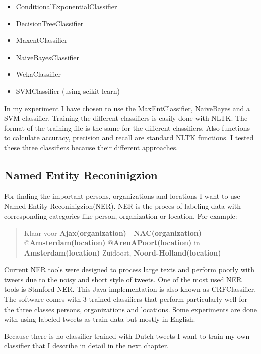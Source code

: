 \documentclass[
10pt, %
a4paper, %
oneside, %
headinclude,footinclude, %
BCOR5mm, %
]{scrartcl}
\begin{document}
\begin{itemize}[noitemsep]
\item ConditionalExponentialClassifier
\item DecisionTreeClassifier
\item MaxentClassifier
\item NaiveBayesClassifier
\item WekaClassifier
\item SVMClassifier (using scikit-learn)
\end{itemize}

In my experiment I have chosen to use the MaxEntClassifier, NaiveBayes and a SVM classifier. Training the different classifiers is easily done with NLTK. The format of the training file is the same for the different classifiers. Also functions to calculate accuracy, precision and recall are standard NLTK functions. I tested these three classifiers because their different approaches.

\newpage
\subsection{Named Entity Reconinigzion}
For finding the important persons, organizations and locations I want to use Named Entity Reconinigzion(NER). NER is the proces of labeling data with corresponding categories like person, organization or location. For example:

\begin {quote}
Klaar voor \textbf{Ajax(organization)} - \textbf{NAC(organization)} @\textbf{Amsterdam(location)} @\textbf{ArenAPoort(location) }in \textbf{Amsterdam(location)} Zuidoost, \textbf{Noord-Holland(location)}
\end{quote}

Current NER tools were designed to process large texts and perform poorly with tweets due to the noisy and short style of tweets. One of the most used NER tools is Stanford NER. This Java implementation is also known as CRFClassifier. The software comes with 3 trained classifiers that perform particularly well for the three classes persons, organizations and locations. Some experiments are done with using labeled tweets as train data but mostly in English.

Because there is no classifier trained with Dutch tweets I want to train my own classifier that I describe in detail in the next chapter.


\newpage
\end{document}
